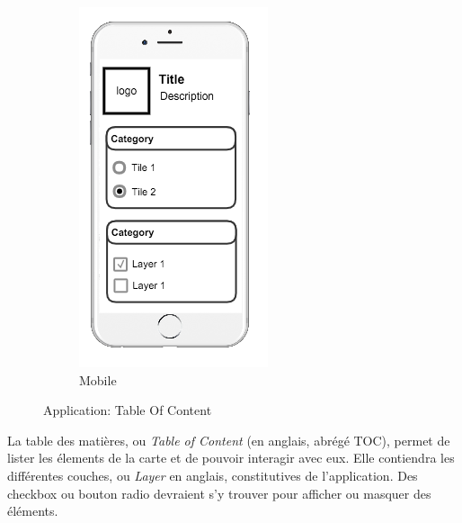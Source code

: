 \begin{figure}[ht]
\begin{subfigure}[b]{0.2\textwidth}
    \includegraphics[width=\textwidth]
      {img/c02-application/png/mobile-basemap-toc.png}
    \caption{Mobile}
  \end{subfigure}
  \caption{Application: Table Of Content}
\end{figure}

La table des matières, ou \textit{Table of Content} (en anglais, abrégé TOC), permet de lister les élements de la carte et de pouvoir interagir avec eux. Elle contiendra les différentes couches, ou \textit{Layer} en anglais, constitutives de l'application. Des checkbox ou bouton radio devraient s'y trouver pour afficher ou masquer des éléments.


